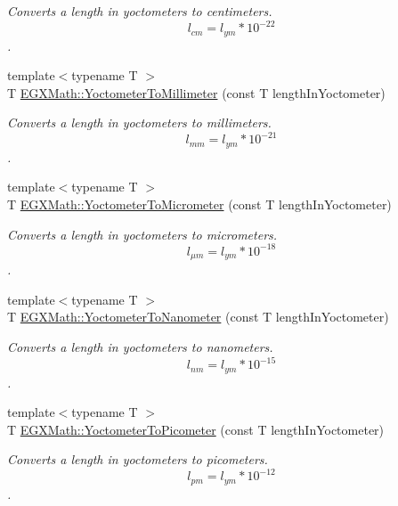 \begin{DoxyCompactItemize}
\begin{DoxyCompactList}\small\item\em Converts a length in yoctometers to centimeters. \[ l_{cm}=l_{ym} * 10^{-22} \]. \end{DoxyCompactList}\item 
{\footnotesize template$<$typename T $>$ }\\T \mbox{\hyperlink{group___e_g_x_math-_conversions-_length_conversions-_yoctometer-_s_i_ga599936dd87aba0a05d16c0c5992928ca}{E\+G\+X\+Math\+::\+Yoctometer\+To\+Millimeter}} (const T length\+In\+Yoctometer)
\begin{DoxyCompactList}\small\item\em Converts a length in yoctometers to millimeters. \[ l_{mm}=l_{ym} * 10^{-21} \]. \end{DoxyCompactList}\item 
{\footnotesize template$<$typename T $>$ }\\T \mbox{\hyperlink{group___e_g_x_math-_conversions-_length_conversions-_yoctometer-_s_i_ga910145f68803fbaa87afd1d30d48c96e}{E\+G\+X\+Math\+::\+Yoctometer\+To\+Micrometer}} (const T length\+In\+Yoctometer)
\begin{DoxyCompactList}\small\item\em Converts a length in yoctometers to micrometers. \[ l_{\mu m}=l_{ym} * 10^{-18} \]. \end{DoxyCompactList}\item 
{\footnotesize template$<$typename T $>$ }\\T \mbox{\hyperlink{group___e_g_x_math-_conversions-_length_conversions-_yoctometer-_s_i_ga209906b099f04d26a1487bedcac4f65d}{E\+G\+X\+Math\+::\+Yoctometer\+To\+Nanometer}} (const T length\+In\+Yoctometer)
\begin{DoxyCompactList}\small\item\em Converts a length in yoctometers to nanometers. \[ l_{nm}=l_{ym} * 10^{-15} \]. \end{DoxyCompactList}\item 
{\footnotesize template$<$typename T $>$ }\\T \mbox{\hyperlink{group___e_g_x_math-_conversions-_length_conversions-_yoctometer-_s_i_gab621b78b78d6776131912bd6038901b9}{E\+G\+X\+Math\+::\+Yoctometer\+To\+Picometer}} (const T length\+In\+Yoctometer)
\begin{DoxyCompactList}\small\item\em Converts a length in yoctometers to picometers. \[ l_{pm}=l_{ym} * 10^{-12} \]. \end{DoxyCompactList}\item 

\end{DoxyCompactItemize}
